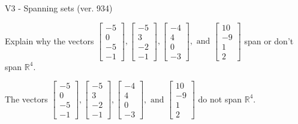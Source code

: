\begin{exercise}
  \begin{exerciseTitle}V3 - Spanning sets (ver. 934)\end{exerciseTitle}
  \begin{exerciseStatement}
    Explain why the vectors \(\left[\begin{array}{r}
-5 \\
0 \\
-5 \\
-1
\end{array}\right] , \left[\begin{array}{r}
-5 \\
3 \\
-2 \\
-1
\end{array}\right] , \left[\begin{array}{r}
-4 \\
4 \\
0 \\
-3
\end{array}\right] , \text{ and } \left[\begin{array}{r}
10 \\
-9 \\
1 \\
2
\end{array}\right]\) span or don't span \(\mathbb{R}^4\). 
	


  \end{exerciseStatement}
  \begin{exerciseAnswer}
   The vectors \(\left[\begin{array}{r}
-5 \\
0 \\
-5 \\
-1
\end{array}\right] , \left[\begin{array}{r}
-5 \\
3 \\
-2 \\
-1
\end{array}\right] , \left[\begin{array}{r}
-4 \\
4 \\
0 \\
-3
\end{array}\right] , \text{ and } \left[\begin{array}{r}
10 \\
-9 \\
1 \\
2
\end{array}\right]\) 
  	 do not  
	span \(\mathbb{R}^4\).
  


  \end{exerciseAnswer}
\end{exercise}